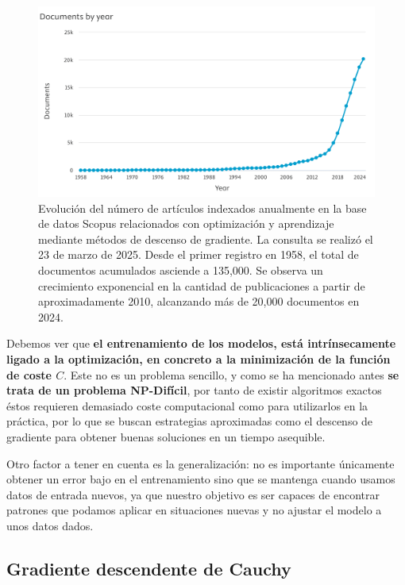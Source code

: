 \begin{figure}[!tbp]
    \centering
    \includegraphics[width=0.75\linewidth]{Plantilla_TFG_latex//imagenes//Mat//GD/scopus_gd.png}
    \caption[Evolución del número de artículos indexados anualmente en la base de datos Scopus relacionados con optimización y aprendizaje mediante métodos de descenso de gradiente]{Evolución del número de artículos indexados anualmente en la base de datos Scopus relacionados con optimización y aprendizaje mediante métodos de descenso de gradiente. La consulta se realizó el 23 de marzo de 2025. Desde el primer registro en 1958, el total de documentos acumulados asciende a 135,000. Se observa un crecimiento exponencial en la cantidad de publicaciones a partir de aproximadamente 2010, alcanzando más de 20,000 documentos en 2024.}
    \label{fig:mat_scopus_gd}
\end{figure}

Debemos ver que \textbf{el entrenamiento de los modelos, está intrínsecamente ligado a la optimización, en concreto a la minimización de la función de coste $C$}. Este no es un problema sencillo, y como se ha mencionado antes \textbf{se trata de un problema NP-Difícil}, por tanto de existir algoritmos exactos éstos requieren demasiado coste computacional como para utilizarlos en la práctica, por lo que se buscan estrategias aproximadas como el descenso de gradiente para obtener buenas soluciones en un tiempo asequible. 

Otro factor a tener en cuenta es la generalización: no es importante únicamente obtener un error bajo en el entrenamiento sino que se mantenga cuando usamos datos de entrada nuevos, ya que nuestro objetivo es ser capaces de encontrar patrones que podamos aplicar en situaciones nuevas y no ajustar el modelo a unos datos dados.

\subsection{Gradiente descendente de Cauchy}

